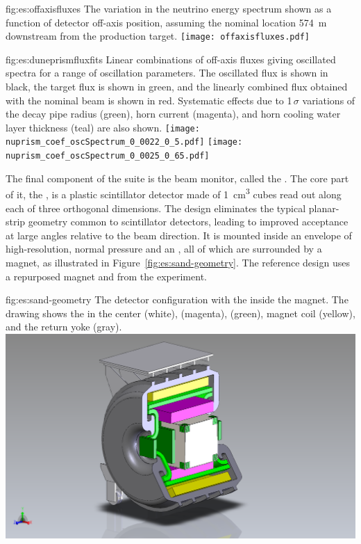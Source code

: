 \begin{dunefigure}{fig:es:offaxisfluxes}
{The variation in the neutrino energy spectrum shown as a function of detector off-axis position, assuming the nominal  location 574~m downstream from the production target.}
\texttt{[image: offaxisfluxes.pdf]}
\end{dunefigure}
\begin{dunefigure}{fig:es:duneprismfluxfits}
{Linear combinations of off-axis fluxes giving  oscillated spectra for a range of oscillation parameters. The   oscillated flux is shown in black, the target flux is shown in green, and the linearly combined flux obtained with the nominal beam  is shown in red. Systematic effects due to 1$\,\sigma$ variations of the decay pipe radius (green), horn current (magenta), and horn cooling water layer thickness (teal) are also shown.}
	\texttt{[image: nuprism\_coef\_oscSpectrum\_0\_0022\_0\_5.pdf]}
	\texttt{[image: nuprism\_coef\_oscSpectrum\_0\_0025\_0\_65.pdf]}
\end{dunefigure}

The final component of the   suite is the beam monitor, called the .  The core part of it, the , is a plastic scintillator detector made of \SI{1}{\cubic\centi\meter} cubes read out along each of three orthogonal dimensions.  The design eliminates the typical planar-strip geometry common to scintillator detectors, leading to improved acceptance at large angles relative to the beam direction. It is mounted  
inside an envelope of high-resolution, normal pressure  and an , all 
of which are surrounded by a magnet, as illustrated in Figure~\ref{fig:es:sand-geometry}.  The reference design uses a repurposed magnet and  from the  experiment.

\begin{dunefigure}{fig:es:sand-geometry}
{The  detector configuration with the  inside the  magnet. The drawing shows the  in the center (white),  (magenta),  (green), magnet coil (yellow), and the return yoke (gray).}
  \includegraphics[width=7.in]{graphics/3DST-KLOE2019-08-01.png}
\end{dunefigure}

